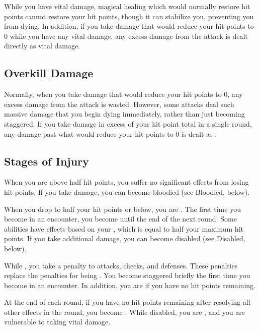         While you have vital damage, magical healing which would normally restore hit points cannot restore your hit points, though it can stabilize you, preventing you from dying.
        In addition, if you take damage that would reduce your hit points to 0 while you have any vital damage, any excess damage from the attack is dealt directly as vital damage.

    \subsection{Overkill Damage}\label{Overkill Damage}
        Normally, when you take damage that would reduce your hit points to 0, any excess damage from the attack is wasted.
        However, some attacks deal such massive damage that you begin dying immediately, rather than just becoming staggered.
        If you take damage in excess of your  hit point total in a single round, any damage past what would reduce your hit points to 0 is dealt as .

    \subsection{Stages of Injury}

         When you are above half hit points, you suffer no significant effects from losing hit points.
        If you take damage, you can become bloodied (see Bloodied, below).

         When you drop to half your hit points or below, you are \bloodied.
        The first time you become  in an encounter, you become  until the end of the next round.
        Some abilities have effects based on your , which is equal to half your maximum hit points.
        If you take additional damage, you can become disabled (see Disabled, below).

        While , you take a  penalty to attacks, checks, and defenses.
        These penalties replace the penalties for being .
        You become staggered briefly the first time you become  in an encounter.
        In addition, you are  if you have no hit points remaining.

        \label{Disabled} At the end of each round, if you have no hit points remaining after resolving all other effects in the round, you become \disabled.
        While disabled, you are \staggered, and you are vulnerable to taking vital damage.

